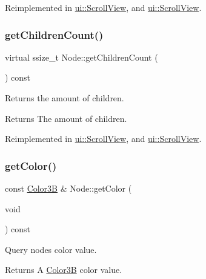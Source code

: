 Reimplemented in \hyperlink{classui_1_1ScrollView_a129cd98a1960479ab18dd43486ed0856}{ui\+::\+Scroll\+View}, and \hyperlink{classui_1_1ScrollView_ab3597728897d06856656a377ef26e73c}{ui\+::\+Scroll\+View}.

\mbox{\label{classNode_a2ae0db7fcb1347684d462a873944b534}} 
\subsubsection{\texorpdfstring{get\+Children\+Count()}{getChildrenCount()}\hspace{0.1cm}{\footnotesize\ttfamily [2/2]}}
{\footnotesize\ttfamily virtual ssize\+\_\+t Node\+::get\+Children\+Count (\begin{DoxyParamCaption}{ }\end{DoxyParamCaption}) const\hspace{0.3cm}{\ttfamily [virtual]}}

Returns the amount of children.

\begin{DoxyReturn}{Returns}
The amount of children. 
\end{DoxyReturn}


Reimplemented in \hyperlink{classui_1_1ScrollView_a129cd98a1960479ab18dd43486ed0856}{ui\+::\+Scroll\+View}, and \hyperlink{classui_1_1ScrollView_ab3597728897d06856656a377ef26e73c}{ui\+::\+Scroll\+View}.

\mbox{\label{classNode_a06721d272f5a59e02e355d95be25bb99}} 
\subsubsection{\texorpdfstring{get\+Color()}{getColor()}\hspace{0.1cm}{\footnotesize\ttfamily [1/2]}}
{\footnotesize\ttfamily const \hyperlink{structColor3B}{Color3B} \& Node\+::get\+Color (\begin{DoxyParamCaption}\item[{void}]{ }\end{DoxyParamCaption}) const\hspace{0.3cm}{\ttfamily [virtual]}}

Query node\textquotesingle{}s color value. \begin{DoxyReturn}{Returns}
A \hyperlink{structColor3B}{Color3B} color value. 
\end{DoxyReturn}


